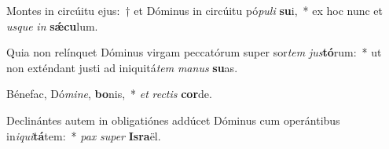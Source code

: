 \item Montes in circúitu ejus:~† et Dóminus in circúitu pó\textit{pu}\textit{li} \textbf{su}i,~* ex hoc nunc et \textit{us}\textit{que} \textit{in} \textbf{sǽ}\textbf{cu}lum.
\item Quia non relínquet Dóminus virgam peccatórum super sor\textit{tem} \textit{jus}\textbf{tó}rum:~* ut non exténdant justi ad iniquitá\textit{tem} \textit{ma}\textit{nus} \textbf{su}as.
\item Bénefac, Dó\textit{mi}\textit{ne}, \textbf{bo}nis,~* \textit{et} \textit{rec}\textit{tis} \textbf{cor}de.
\item Declinántes autem in obligatiónes addúcet Dóminus cum operántibus in\textit{i}\textit{qui}\textbf{tá}tem:~* \textit{pax} \textit{su}\textit{per} \textbf{Is}\textbf{ra}ël.

